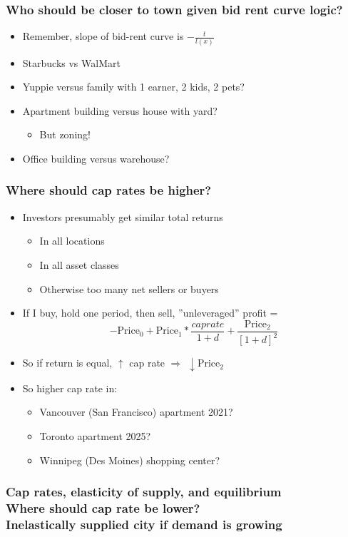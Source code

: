 \documentclass{beamer}
\begin{document}
\begin{frame}
	\frametitle{Who should be closer to town given bid rent curve logic?}
	\begin{itemize}
		\item Remember, slope of bid-rent curve is $-\frac{t}{l(x)}$
		\item Starbucks vs WalMart
		\item Yuppie versus family with 1 earner, 2 kids, 2 pets?
		\item Apartment building versus house with yard?
			\begin{itemize}
				\item But zoning!
			\end{itemize}
		\item Office building versus warehouse?
	\end{itemize}
\end{frame}

\begin{frame}
	\frametitle{Where should cap rates be higher?}
	\begin{itemize}
		\item Investors presumably get similar total returns
			\begin{itemize}
				\item In all locations
				\item In all asset classes
				\item Otherwise too many net sellers or buyers
			\end{itemize}
		\item If I buy, hold one period, then sell, ''unleveraged'' profit = 
			$$- \text{Price}_{0} + \text{Price}_{1} * \frac{cap rate}{1+d} + \frac{\text{Price}_{2}}{\left[1+d\right]^2}$$
		\item So if return is equal, $\uparrow$ cap rate $\Rightarrow$ $\downarrow \text{Price}_{2}$
		\item So higher cap rate in:
			\begin{itemize}
				\item Vancouver (San Francisco) apartment 2021?
				\item Toronto apartment 2025?
				\item Winnipeg (Des Moines) shopping center?
			\end{itemize}
	\end{itemize}
\end{frame}

\begin{frame}
	\frametitle{Cap rates, elasticity of supply, and equilibrium\\Where should cap rate be lower?\\Inelastically supplied city if demand is growing}
\end{frame}
\end{document}
